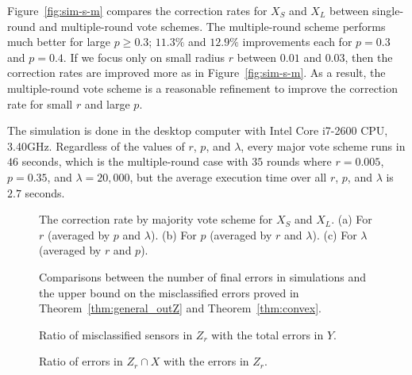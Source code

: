 \documentclass{article}
\begin{document}
\par
Figure~\ref{fig:sim-s-m} compares the correction rates for $X_S$ and $X_L$ between single-round and multiple-round vote schemes. The multiple-round scheme performs much better for large $p \geq 0.3$; $11.3\%$ and $12.9\%$ improvements each for $p = 0.3$ and $p= 0.4$. If we focus only on small radius $r$ between $0.01$ and $0.03$, then the correction rates are improved more as in Figure~\ref{fig:sim-s-m}. As a result, the multiple-round vote scheme is a reasonable refinement to improve the correction rate for small $r$ and large $p$.

The simulation is done in the desktop computer with Intel Core i7-2600 CPU, 3.40GHz. Regardless of the values of $r$, $p$, and $\lambda$, every major vote scheme runs in $46$ seconds, which is the multiple-round case with $35$ rounds where $r = 0.005$, $p = 0.35$, and $\lambda = 20,000$, but the average execution time over all $r$, $p$, and $\lambda$ is $2.7$ seconds.

\begin{figure}
\centering
\mbox{}
\mbox{}
\mbox{}
\caption{The correction rate by majority vote scheme for $X_S$ and $X_L$. (a) For $r$ (averaged by $p$ and $\lambda$). (b) For $p$ (averaged by $r$ and $\lambda$). (c) For $\lambda$ (averaged by $r$ and $p$).}
\label{fig:sim-ratio}
\end{figure}

\begin{figure}
\centering
\mbox{}
\mbox{}
\mbox{}
\caption{Comparisons between the number of final errors in simulations and the upper bound on the misclassified errors proved in Theorem~\ref{thm:general_outZ} and Theorem~\ref{thm:convex}.}
\label{fig:sim-ub-final}
\end{figure}

\begin{figure}
\centering
\mbox{}
\mbox{}
\mbox{}
\caption{Ratio of misclassified sensors in $Z_r$ with the total errors in $Y$.}
\label{fig:sim-beta}
\end{figure}

\begin{figure}
\centering
\mbox{}
\mbox{}
\mbox{}
\caption{Ratio of errors in $Z_r\cap X$ with the errors in $Z_r$.}
\label{fig:sim-gamma}
\end{figure}
\end{document}
